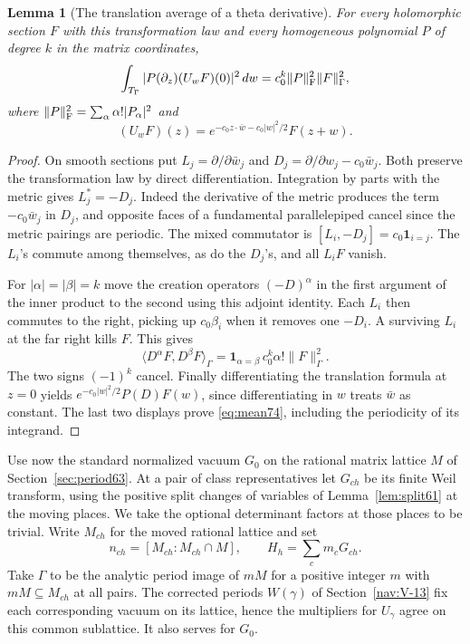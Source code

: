 \documentclass[a4paper,11pt]{article}
\newtheorem{lemma}[proposition]{Lemma}
\theoremstyle{definition}
\theoremstyle{remark}
\numberwithin{equation}{section}
\begin{document}
\begin{lemma}[The translation average of a theta derivative]\label{lem:mean74}
For every holomorphic section \(F\) with this transformation
law and every homogeneous polynomial \(P\) of degree \(k\)
in the matrix coordinates,
\begin{equation}
 \int_{T_\Gamma}
       |P(\partial_z)(U_wF)(0)|^2\,dw
     =c_0^k\|P\|_{\rm F}^2\|F\|_\Gamma^2,
                                                        \label{eq:mean74}
\end{equation}
where \(\|P\|_{\rm F}^2=\sum_\alpha\alpha!|P_\alpha|^2\) and
\[
          (U_wF)(z)=
          e^{-c_0z\cdot\bar w-c_0|w|^2/2}F(z+w).
\]
\end{lemma}
\begin{proof}
On smooth sections put
\(L_j=\partial/\partial\bar w_j\) and
\(D_j=\partial/\partial w_j-c_0\bar w_j\).
Both preserve the transformation law by direct differentiation.
Integration by parts with the metric gives \(L_j^*=-D_j\).
Indeed the derivative of the metric produces the term
\(-c_0\bar w_j\) in \(D_j\), and opposite faces of a fundamental
parallelepiped cancel since the metric pairings are periodic.
The mixed commutator is \([L_i,-D_j]=c_0\mathbf1_{i=j}\).
The \(L_i\)'s commute among themselves, as do the \(D_j\)'s,
and all \(L_i F\) vanish.

For \(|\alpha|=|\beta|=k\) move the creation operators
\((-D)^\alpha\) in the first argument of the inner product to
the second using this adjoint identity. Each \(L_i\) then
commutes to the right, picking up \(c_0\beta_i\) when it removes
one \(-D_i\). A surviving \(L_i\) at the far right kills \(F\).
This gives
\[
    \langle D^\alpha F,D^\beta F\rangle_\Gamma
       =\mathbf1_{\alpha=\beta}\,c_0^k\alpha!\|F\|_\Gamma^2.
\]
The two signs \((-1)^k\) cancel. Finally differentiating the
translation formula at \(z=0\) yields
\(e^{-c_0|w|^2/2}P(D)F(w)\), since differentiating in \(w\)
treats \(\bar w\) as constant. The last two displays prove
\eqref{eq:mean74}, including the periodicity of its integrand.
\end{proof}

Use now the standard normalized vacuum \(G_0\) on the rational
matrix lattice \(M\) of Section~\ref{sec:period63}. At a pair
of class representatives let \(G_{ch}\) be its finite Weil
transform, using the positive split changes of variables of
Lemma~\ref{lem:split61} at the moving places. We take the
optional determinant factors at those places to be trivial.
Write \(M_{ch}\) for the moved rational lattice and set
\[
          n_{ch}=[M_{ch}:M_{ch}\cap M],\qquad
          H_h=\sum_c m_c G_{ch}.
\]
Take \(\Gamma\) to be the analytic period image of \(mM\)
for a positive integer \(m\) with \(mM\subseteq M_{ch}\)
at all pairs. The corrected periods \(W(\gamma)\) of Section~\ref{nav:V-13}
fix each corresponding vacuum on its lattice, hence the
multipliers for \(U_\gamma\) agree on this common sublattice.
It also serves for \(G_0\).
\end{document}
